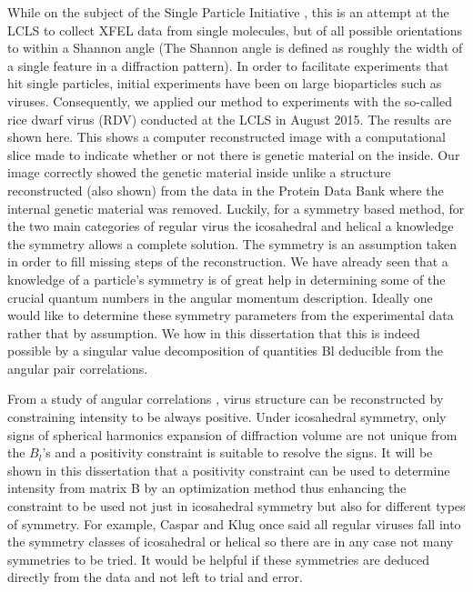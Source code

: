 While on the subject of the Single Particle Initiative \cite{Munke}, this is an attempt at the LCLS to collect XFEL data from single molecules, but of all possible orientations to within a Shannon angle (The Shannon angle is defined as roughly the width of a single feature in  a diffraction pattern). In order to facilitate experiments that hit single particles, initial experiments have been on large bioparticles such as viruses. Consequently, we applied our method to experiments with the so-called rice dwarf virus (RDV) \cite{Munke} conducted at the LCLS in August 2015. The results are shown here. This shows a computer reconstructed image with a computational slice made to indicate whether or not there is genetic material on the inside. Our image correctly showed the genetic material inside unlike a structure reconstructed (also shown) from the data in the Protein Data Bank where the internal genetic material was removed.
Luckily, for a symmetry based method, for the two main categories of regular virus the icosahedral \cite{saldinvirus} and helical \cite{PoonFiber} a knowledge the symmetry allows a complete solution. The symmetry is an assumption taken in order to fill missing steps of the reconstruction. We have already seen that a knowledge of a particle’s symmetry is of great help in determining some of the crucial quantum numbers in the angular momentum description. Ideally one would like to determine these symmetry parameters from the experimental data rather that by assumption. We how in this dissertation that this is indeed possible by a singular value decomposition of quantities Bl deducible from the angular pair correlations.

From a study of angular correlations \cite{saldinvirus}, virus structure can be reconstructed by constraining intensity to be always positive. Under icosahedral symmetry, only signs of spherical harmonics expansion of diffraction volume are not unique from the $B_l$’s and a positivity constraint is suitable to resolve the signs. It will be shown in this dissertation that a positivity constraint can be used to determine intensity from matrix B by an optimization method thus enhancing the constraint to be used not just in icosahedral symmetry but also for different types of symmetry. For example, Caspar and Klug once said \cite{Casper} all regular viruses fall into the symmetry classes of icosahedral or helical so there are in any case not many symmetries to be tried. It would be helpful if these symmetries are deduced directly from the data and not left to trial and error.

